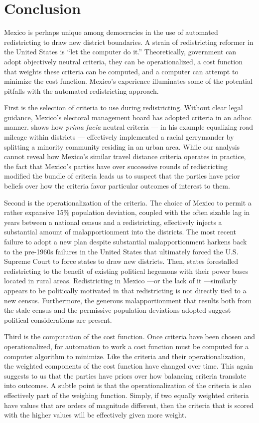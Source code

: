 \documentclass[letter,12pt]{article}
\begin{document}
\section{Conclusion}

Mexico is perhaps unique among democracies in the use of automated redistricting to draw new district boundaries. A strain of redistricting reformer in the United States is ``let the computer do it.'' Theoretically, government can adopt objectively neutral criteria, they can be operationalized, a cost function that weights these criteria can be computed, and a computer can attempt to minimize the cost function. Mexico's experience illuminates some of the potential pitfalls with the automated redistricting approach.

First is the selection of criteria to use during redistricting. Without clear legal guidance, Mexico's electoral management board has adopted criteria in an adhoc manner. \citet{parker.1990} shows how \emph{prima facia} neutral criteria --- in his example equalizing road mileage within districts --- effectively implemented a racial gerrymander by splitting a minority community residing in an urban area. While our analysis cannot reveal how Mexico's similar travel distance criteria operates in practice, the fact that Mexico's parties have over successive rounds of redistricting modified the bundle of criteria leads us to suspect that the parties have prior beliefs over how the criteria favor particular outcomes of interest to them.

Second is the operationalization of the criteria. The choice of Mexico to permit a rather expansive 15\% population deviation, coupled with the often sizable lag in years between a national census and a redistricting, effectively injects a substantial amount of malapportionment into the districts. The most recent failure to adopt a new plan despite substantial malapportionment harkens back to the pre-1960s failures in the United States that ultimately forced the U.S. Supreme Court to force states to draw new districts. Then, states forestalled redistricting to the benefit of existing political hegemons with their power bases located in rural areas. Redistricting in Mexico ---or the lack of it ---similarly appears to be politically motivated in that redistricting is not directly tied to a new census. Furthermore, the generous malapportionment that results both from the stale census and the permissive population deviations adopted suggest political considerations are present.

Third is the computation of the cost function. Once criteria have been chosen and operationalized, for automation to work a cost function must be computed for a computer algorithm to minimize. Like the criteria and their operationalization, the weighted components of the cost function have changed over time. This again suggests to us that the parties have priors over how balancing criteria translate into outcomes. A subtle point is that the operationalization of the criteria is also effectively part of the weighing function. Simply, if two equally weighted criteria have values that are orders of magnitude different, then the criteria that is scored with the higher values will be effectively given more weight.
\end{document}
